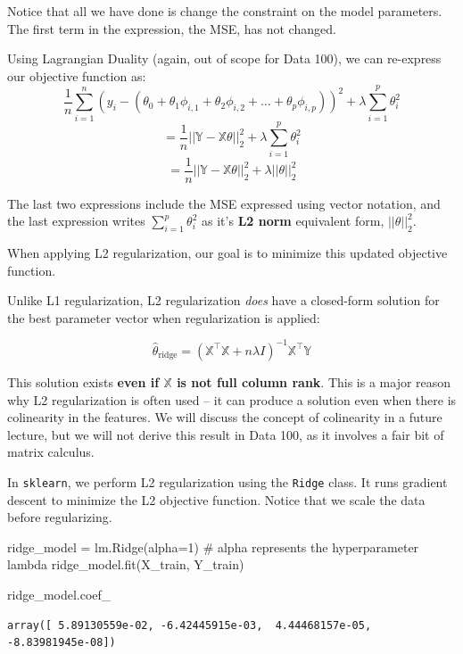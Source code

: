 \documentclass[
  letterpaper,
  DIV=11,
  numbers=noendperiod]{scrreprt}
\newenvironment{Shaded}{\begin{snugshade}}{\end{snugshade}}
\newcommand{\CommentTok}[1]{\textcolor[rgb]{0.37,0.37,0.37}{#1}}
\newcommand{\DecValTok}[1]{\textcolor[rgb]{0.68,0.00,0.00}{#1}}
\newcommand{\NormalTok}[1]{\textcolor[rgb]{0.00,0.23,0.31}{#1}}
\newcommand{\OperatorTok}[1]{\textcolor[rgb]{0.37,0.37,0.37}{#1}}
\begin{document}
Notice that all we have done is change the constraint on the model
parameters. The first term in the expression, the MSE, has not changed.

Using Lagrangian Duality (again, out of scope for Data 100), we can
re-express our objective function as:
\[\frac{1}{n} \sum_{i=1}^n (y_i - (\theta_0 + \theta_1 \phi_{i, 1} + \theta_2 \phi_{i, 2} + \ldots + \theta_p \phi_{i, p}))^2 + \lambda \sum_{i=1}^p \theta_i^2\]
\[= \frac{1}{n}||\mathbb{Y} - \mathbb{X}\theta||_2^2 + \lambda \sum_{i=1}^p \theta_i^2\]
\[= \frac{1}{n}||\mathbb{Y} - \mathbb{X}\theta||_2^2 + \lambda || \theta ||_2^2\]

The last two expressions include the MSE expressed using vector
notation, and the last expression writes \(\sum_{i=1}^p \theta_i^2\) as
it's \textbf{L2 norm} equivalent form, \(|| \theta ||_2^2\).

When applying L2 regularization, our goal is to minimize this updated
objective function.

Unlike L1 regularization, L2 regularization \emph{does} have a
closed-form solution for the best parameter vector when regularization
is applied:

\[\hat\theta_{\text{ridge}} = (\mathbb{X}^{\top}\mathbb{X} + n\lambda I)^{-1}\mathbb{X}^{\top}\mathbb{Y}\]

This solution exists \textbf{even if \(\mathbb{X}\) is not full column
rank}. This is a major reason why L2 regularization is often used -- it
can produce a solution even when there is colinearity in the features.
We will discuss the concept of colinearity in a future lecture, but we
will not derive this result in Data 100, as it involves a fair bit of
matrix calculus.

In \texttt{sklearn}, we perform L2 regularization using the
\texttt{Ridge} class. It runs gradient descent to minimize the L2
objective function. Notice that we scale the data before regularizing.

\begin{Shaded}
\begin{Highlighting}[]
\NormalTok{ridge\_model }\OperatorTok{=}\NormalTok{ lm.Ridge(alpha}\OperatorTok{=}\DecValTok{1}\NormalTok{) }\CommentTok{\# alpha represents the hyperparameter lambda}
\NormalTok{ridge\_model.fit(X\_train, Y\_train)}

\NormalTok{ridge\_model.coef\_}
\end{Highlighting}
\end{Shaded}

\begin{verbatim}
array([ 5.89130559e-02, -6.42445915e-03,  4.44468157e-05, -8.83981945e-08])
\end{verbatim}
\end{document}
